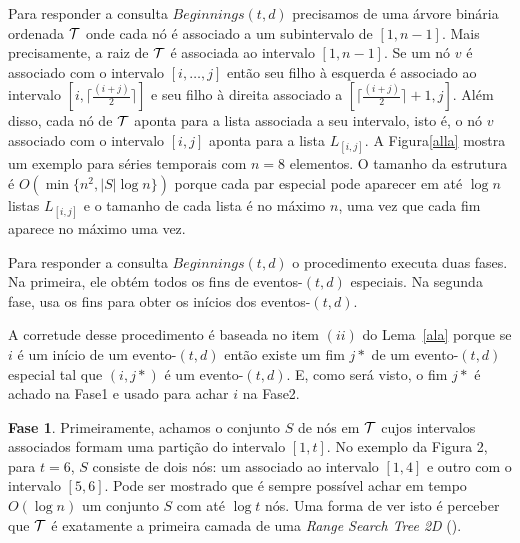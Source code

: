 \documentclass[12pt]{article}
\begin{document}
Para responder a consulta $Beginnings(t,d)$ precisamos de uma árvore binária ordenada ${\cal T}$
onde cada nó é associado a um subintervalo de $[1, n - 1]$. Mais precisamente, a raiz de ${\cal T}$
é associada ao intervalo $[1, n - 1]$. Se um nó $v$ é associado com o intervalo $[i, \ldots, j]$ então
seu filho à esquerda é associado ao intervalo $[i, \lceil \frac{(i + j)}{2} \rceil]$ e seu filho à direita associado
a $[\lceil \frac{(i + j)}{2} \rceil  + 1, j]$. Além disso, cada nó de ${\cal T}$ aponta para a lista associada a seu intervalo, isto é, o nó $v$ associado com o intervalo $[i, j]$ aponta para a lista $L_{[i, j]}$. A Figura\ref{alla}
mostra um exemplo para séries temporais com $n = 8$ elementos. O tamanho da estrutura é $O(\min\{n^2, |S|\log n\})$ porque cada par especial pode aparecer em até $\log n$ listas $L_{[i, j]}$ e o tamanho de cada lista
é no máximo $n$, uma vez que cada fim aparece no máximo uma vez.

Para responder a consulta $Beginnings(t,d)$ o procedimento executa duas fases. Na primeira, 
ele obtém todos os fins de eventos-$(t,d)$ especiais. Na segunda fase, usa os fins para obter
os inícios dos eventos-$(t,d)$.

A corretude desse procedimento é baseada no item $(ii)$ do Lema~\ref{ala} porque se $i$ é um
início de um evento-$(t,d)$ então existe um fim $j*$ de um evento-$(t,d)$ especial tal que $(i, j*)$
é um evento-$(t,d)$. E, como será visto, o fim $j*$ é achado na Fase1 e usado para achar $i$ na Fase2.

\textbf{Fase 1}. Primeiramente, achamos o conjunto $S$ de nós em ${\cal T}$ cujos intervalos associados
formam uma partição do intervalo $[1, t]$. No exemplo da Figura 2, para $t = 6$, $S$ consiste de 
dois nós: um associado ao intervalo $[1, 4]$ e outro com o intervalo $[5, 6]$. Pode ser mostrado 
que é sempre possível achar em tempo $O(\log n)$ um conjunto $S$ com até $\log t$ nós. Uma forma
de ver isto é perceber que ${\cal T}$ é exatamente a primeira camada de uma \textit{Range Search Tree 2D}
(\cite{alla}).
\end{document}

